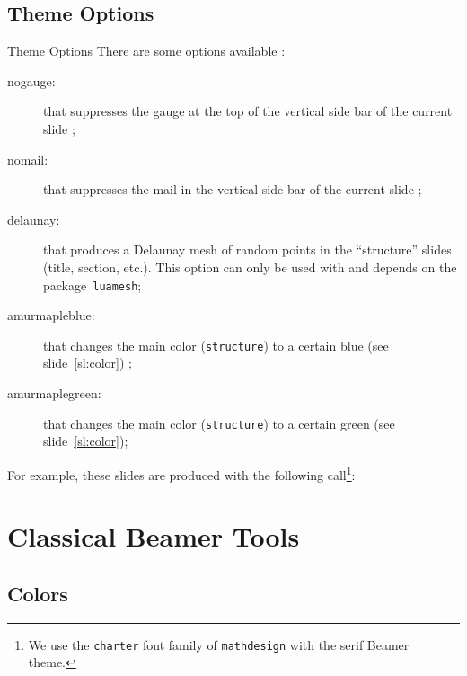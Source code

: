 \documentclass[10pt,aspectratio=169,english]{beamer}
\begin{document}
\subsection{Theme Options}

\begin{frame}[fragile]{Theme Options}
  There are some options available :
  \begin{description}
  \item[nogauge:] that suppresses the gauge at the top of the vertical side bar
    of the current slide ;
  \item[nomail:] that suppresses the mail in the vertical side bar of
    the current slide ;
  \item[delaunay:] that produces a Delaunay mesh of random points in
    the ``structure'' slides (title, section, etc.). \alert{This option can only be
    used with } and depends on the
  package~\lstinline{luamesh};
  \item[amurmapleblue:] that changes the main color (\lstinline+structure+) to a
    certain blue (see slide~\ref{sl:color}) ;
  \item[amurmaplegreen:] that changes the main color (\lstinline+structure+) to a
    certain green (see slide~\ref{sl:color});
  \end{description}
  For example, these slides are produced with the following call\footnote{We use
  the \texttt{charter} font family of \texttt{mathdesign}  with the serif Beamer theme.}:
  \begin{CodePreambule}
  \end{CodePreambule}
\end{frame}



\section{Classical Beamer Tools}
\sepframe
\subsection{Colors}
\end{document}

